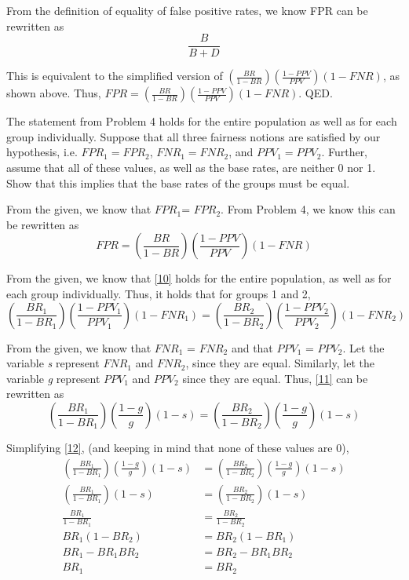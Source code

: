 \documentclass{cisXXX} %
\begin{document}
From the definition of equality of false positive rates, we know FPR can be rewritten as
$$\frac{B}{B+D}$$

This is equivalent to the simplified version of $(\frac{BR}{1-BR})(\frac{1-PPV}{PPV})(1 -FNR)$, as shown above. Thus, $FPR = (\frac{BR}{1-BR})(\frac{1-PPV}{PPV})(1 -FNR)$. QED.

\HWproblem
The statement from Problem 4 holds for the entire population as well as for each group individually. Suppose that all three fairness notions are satisfied by our hypothesis, i.e. $FPR_1 = FPR_2$, $FNR_1 = FNR_2$, and $PPV_1 = PPV_2$. Further, assume that all of these values, as well as the base rates, are neither 0 nor 1. Show that this implies that the base rates of the groups must be equal.

From the given, we know that $FPR_1 $= $FPR_2$. From Problem 4, we know this can be rewritten as
\begin{equation}
\label{10} FPR = (\frac{BR}{1-BR})(\frac{1-PPV}{PPV})(1 -FNR)
\end{equation}

From the given, we know that \eqref{10} holds for the entire population, as well as for each group individually. Thus, it holds that for groups 1 and 2,
\begin{equation}
\label{11} (\frac{BR_1}{1-BR_1})(\frac{1-PPV_1}{PPV_1})(1 -FNR_1) = (\frac{BR_2}{1-BR_2})(\frac{1-PPV_2}{PPV_2})(1 -FNR_2)
\end{equation}

From the given, we know that $FNR_1$ = $FNR_2$ and that $PPV_1$ = $PPV_2$. Let the variable \textit{s} represent $FNR_1$ and $FNR_2$, since they are equal. Similarly, let the variable \textit{g} represent $PPV_1$ and $PPV_2$ since they are equal. Thus, \eqref{11} can be rewritten as
\begin{equation}
\label{12} (\frac{BR_1}{1-BR_1})(\frac{1-g}{g})(1 -s) = (\frac{BR_2}{1-BR_2})(\frac{1-g}{g})(1 -s)
\end{equation}

Simplifying \eqref{12}, (and keeping in mind that none of these values are 0),
\begin{align*}
(\frac{BR_1}{1-BR_1})(\frac{1-g}{g})(1 -s) &= (\frac{BR_2}{1-BR_2})(\frac{1-g}{g})(1 -s)\\
(\frac{BR_1}{1-BR_1})(1 -s) &= (\frac{BR_2}{1-BR_2})(1 -s)\\
\frac{BR_1}{1-BR_1} &= \frac{BR_2}{1-BR_2}\\
BR_1(1-BR_2) &= BR_2(1-BR_1)\\
BR_1 - BR_1BR_2 &= BR_2 - BR_1BR_2\\
BR_1 &= BR_2
\end{align*}
\end{document}
